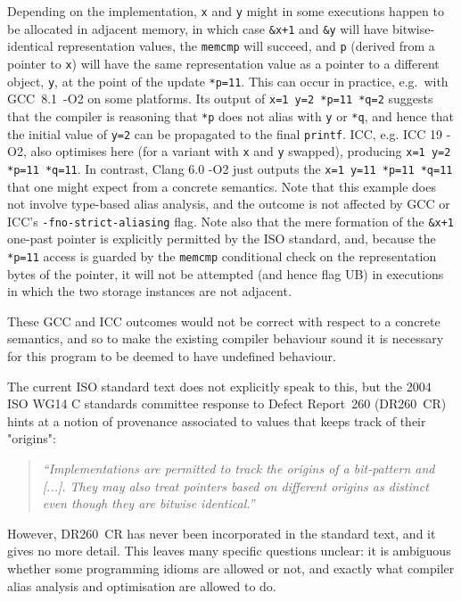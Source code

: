 \documentclass[acmsmall,review,screen]{acmart}\settopmatter{printfolios=true,printccs=false,printacmref=false}
\begin{document}
Depending on the implementation, 
 \lstinline{x} and \lstinline{y} might  in some executions
happen to be allocated in adjacent memory, in which case 
 \lstinline{&x+1} and \lstinline{&y} will have bitwise-identical representation values, the \lstinline{memcmp} will succeed, and
\lstinline{p} (derived from a pointer
to \lstinline{x}) will have the same
representation value as a pointer to a different object, \lstinline{y}, at the point of the
update \lstinline{*p=11}. This can occur in practice, e.g.~with \mbox{GCC
8.1 -O2} on some platforms. Its output of
%
\texttt{x=1 y=2 *p=11 *q=2}
%
suggests that the compiler is reasoning that \lstinline{*p} does not alias with \lstinline{y} or \lstinline{*q}, and
hence that the initial value of \lstinline{y=2} can be propagated to the
final \lstinline{printf}.
%
ICC, e.g. ICC 19 -O2, also optimises here
(for a variant with \texttt{x} and \texttt{y} swapped),  producing \texttt{x=1 y=2 *p=11 *q=11}.
In contrast, Clang 6.0 -O2 just outputs the 
\texttt{x=1 y=11 *p=11 *q=11} that one might expect from a concrete
semantics.
Note that this example does not involve type-based alias analysis, and
the outcome is not affected by GCC or ICC's \lstinline{-fno-strict-aliasing}
flag.
Note also that the mere formation of the \lstinline{&x+1} one-past pointer 
is explicitly permitted by the ISO standard, and, because the
\lstinline{*p=11} access
is guarded by the \lstinline{memcmp} conditional check on the representation bytes of the
pointer, it will not be attempted (and hence flag UB) in executions in
which the two storage instances are not adjacent. 


These GCC and ICC outcomes would not be correct with respect to a concrete
semantics, and so to make the existing compiler behaviour sound it is necessary for this
program to be deemed to have undefined behaviour.
%



%
%
%
The current ISO standard text does not explicitly speak to this, but
the 2004 ISO WG14 C standards committee response to Defect Report~260 (DR260~CR)~\cite{dr260}
hints at a notion of provenance associated to values that
keeps track of their "origins":

\begin{quote}
\emph{``Implementations are permitted to track the origins of a
bit-pattern and [...]. They may also treat
pointers based on different origins as distinct even though they are
bitwise identical.''}

\end{quote}
However, DR260~CR has never been
incorporated in the standard text, and it gives no more detail.  This leaves many specific
questions unclear: it is ambiguous whether some programming idioms are allowed or
not, and exactly what compiler alias analysis and optimisation
are allowed to do.
\end{document}
